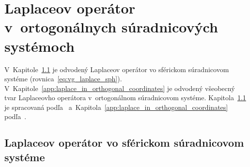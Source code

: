 \documentclass[a4paper, 12pt]{book}
\begin{document}
\chapter{Laplaceov operátor v~ortogonálnych súradnicových systémoch}
\label{app:laplace_in_spherical_coordinates}

V~Kapitole~\ref{app:laplace_in_spherical_system} je odvodený Laplaceov operátor 
vo sférickom súradnicovom systéme (rovnica~\ref{eq:vg_laplace_sph}).  
V~Kapitole~\ref{app:laplace_in_orthogonal_coordinates} je odvodený všeobecný 
tvar Laplaceovho operátora v~ortogonálnom súradnicovom systéme.  
Kapitola~\ref{app:laplace_in_spherical_system} je spracovaná 
podľa~\textcite{MichelLectures} 
a~Kapitola~\ref{app:laplace_in_orthogonal_coordinates} 
podľa~\textcite{SansoGeoidDetermination}.


\section{Laplaceov operátor vo sférickom súradnicovom systéme}
\label{app:laplace_in_spherical_system}
\end{document}
